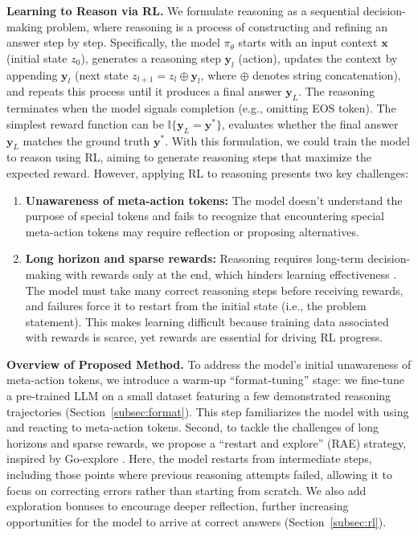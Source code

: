 \textbf{Learning to Reason via RL.}  
We formulate reasoning as a sequential decision-making problem, where reasoning is a process of constructing and refining an answer step by step. Specifically, the model $\pi_\theta$ starts with an input context $\boldsymbol{x}$ (initial state $z_0$), generates a reasoning step $\boldsymbol{y}_l$ (action), updates the context by appending $\boldsymbol{y}_l$ (next state $z_{l+1} = z_{l} \oplus \boldsymbol{y}_l$, where $\oplus$ denotes string concatenation), and repeats this process until it produces a final answer $\boldsymbol{y}_L$. The reasoning terminates when the model signals completion (e.g., omitting EOS token). The simplest reward function can be $\mathbb{I}\{\boldsymbol{y}_L = \boldsymbol{y}^*\}$, evaluates whether the final answer $\boldsymbol{y}_L$ matches the ground truth $\boldsymbol{y}^*$. With this formulation, we could train the model to reason using RL, aiming to generate reasoning steps that maximize the expected reward. However, applying RL to reasoning presents two key challenges: 
\begin{enumerate}
\vspace{-0.5em}
    \item \textbf{Unawareness of meta-action tokens:} The model doesn't understand the purpose of special tokens and fails to recognize that encountering special meta-action tokens may require reflection or proposing alternatives.
    \item \textbf{Long horizon and sparse rewards:} Reasoning requires long-term decision-making with rewards only at the end, which hinders learning effectiveness \citep{bellemare2016unifying}. The model must take many correct reasoning steps before receiving rewards, and failures force it to restart from the initial state (i.e., the problem statement). This makes learning difficult because training data associated with rewards is scarce, yet rewards are essential for driving RL progress.
    \vspace{-0.5em}
\end{enumerate}


\textbf{Overview of Proposed Method.} 
To address the model’s initial unawareness of meta-action tokens, we introduce a warm-up “format-tuning” stage: we fine-tune a pre-trained LLM on a small dataset featuring a few demonstrated reasoning trajectories (Section~\ref{subsec:format}). This step familiarizes the model with using and reacting to meta-action tokens. Second, to tackle the challenges of long horizons and sparse rewards, we propose a ``restart and explore'' (RAE) strategy, inspired by Go-explore \citep{ecoffet2019go}. Here, the model restarts from intermediate steps, including those points where previous reasoning attempts failed, allowing it to focus on correcting errors rather than starting from scratch. We also add exploration bonuses to encourage deeper reflection, further increasing opportunities for the model to arrive at correct answers (Section~\ref{subsec:rl}).


